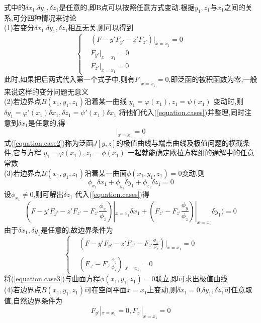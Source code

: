 式中的$\delta x_1.\delta y_1,\delta z_1$是任意的,即B点可以按照任意方式变动.根据$y_1,z_1与x_1$之间的关系,可分四种情况来讨论
\\
(1)若变分$\delta x_1.\delta y_1,\delta z_1$相互无关,则可以得到
$$
\left\{
  \begin{array}{ll}
     & (F - y'F_{y'} - z'F_{z'})|_{x=x_1}=0 \\
     &  F_{y'}|_{x=x_1}=0\\
     & F_{z'}|_{x=x_1}=0
  \end{array}
\right.
$$
此时,如果把后两式代入第一个式子中,则有$F|_{x=x_1}=0$,即泛函的被积函数为零,一般来说这样的变分问题无意义
\\
(2)若边界点$B(x_1,y_1,z_1)$沿着某一曲线
$y_1=\varphi(x_1),z_1=\psi(x_1)$
变动时,则
$\delta y_1=\varphi'(x_1)\delta x_1,\delta z_1=\psi'(x_1)\delta x_1$
将他们代入(\ref{equation.cases})并整理,同时注意到$\delta x_1$是任意的,得
\begin{equation}
 [F + (\varphi' - y')F_{y'} + (\psi' -z')F_{z'}]|_{x=x_1}=0
\label{equation.case2}
\end{equation}
式(\ref{equation.case2})称为泛函$J[y,z]$的极值曲线与端点曲线及极值问题的横截条件,它与方程
$y_1=\varphi(x_1),z_1=\phi(x_1)$
一起就能确定欧拉方程组的通解中的任意常数
\\
(3)若边界点$B(x_1,y_1,z_1)$沿着某一曲面$\phi(x_1,y_1,z_1)=0$变动,则
\begin{equation}
 \phi_{x_1}\delta x_1+
 \phi_{y_1}\delta y_1+
 \phi_{z_1}\delta z_1=0
\end{equation}
设$\phi_{x_1}\neq 0$,则可解出$\delta z_1$
代入(\ref{equation.cases})得
\begin{equation}
(F - y'F_{y'} - z'F_{z'} - F_{z'}\frac{\phi_x}{\phi_z})|_{x=x_1} \delta x_1 +
(F_{z'} -F_{z'}\frac{\phi_y}{\phi_z})|_{x=x_1} \delta y_1  )
=0
\end{equation}
由于$\delta x_1,\delta y_1$是任意的,故边界条件为
\begin{equation}
\left\{
  \begin{array}{lll}
     & (F - y'F_{y'} - z'F_{z'} - F_{z'}\frac{\phi_x}{\phi_z})|_{x=x_1} =0 \\
&\\
    & (F_{z'} -F_{z'}\frac{\phi_y}{\phi_z})|_{x=x_1} =0
  \end{array}
\right.
\label{equation.case3}
\end{equation}
将(\ref{equation.case3})与曲面方程$\phi(x_1,y_1,z_1)=0$联立,即可求出极值曲线
\\
(4)若边界点$B(x_1,y_1,z_1)$可在空间平面$x=x_1$上变动,则$\delta x_1=0$,$\delta y_1,\delta z_1$可任意取值,自然边界条件为
\begin{equation}
F_{y'}|_{x=x_1}=0,
F_{z'}|_{x=x_1}=0
\end{equation}

